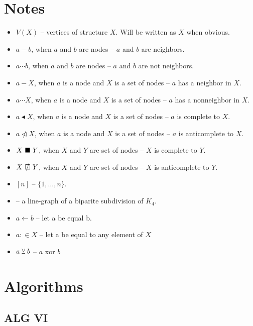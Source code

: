 

\author{Adrian Siwiec}
\date{\today{}}


\section{Notes}
\begin{itemize}
	\item $V(X)$ -- vertices of structure $X$. Will be written as $X$ when obvious.
	\item $a - b$, when $a$ and $b$ are nodes -- $a$ and $b$ are neighbors.
	\item $a \cdots b$, when $a$ and $b$ are nodes -- $a$ and $b$ are not neighbors.
	\item $a - X$, when $a$ is a node and $X$ is a set of nodes -- $a$ has a neighbor in $X$.
	\item $a \cdots X$, when $a$ is a node and $X$ is a set of nodes -- $a$ has a nonneighbor in $X$.
	\item $a \blacktriangleleft  X$, when $a$ is a node and $X$ is a set of nodes -- $a$ is complete to $X$.
	\item $a \ntriangleleft X$, when $a$ is a node and $X$ is a set of nodes -- $a$ is anticomplete to $X$.
	\item $X \ \blacksquare\  Y$, when $X$ and $Y$ are set of nodes -- $X$ is complete to $Y$.
	\item $X \setAntiComplete Y$, when $X$ and $Y$ are set of nodes -- $X$ is anticomplete to $Y$.
	\item $[n]$  -- $\{1, \ldots, n\}$.
	\item \LGBSK -- a line-graph of a biparite subdivision of $K_4$.
	\item $a \gets b$ -- let a be equal b.
	\item $a :\in X$ -- let a be equal to any element of $X$
	\item $a \veebar b$ -- $a$ xor $b$
\end{itemize}
	
\section{Algorithms}
\begin{algorithm}
\end{algorithm}
  

\pagebreak


\pagebreak
	

\pagebreak


\pagebreak

\subsection{ALG VI}

\pagebreak


\pagebreak


\pagebreak


\pagebreak
	

